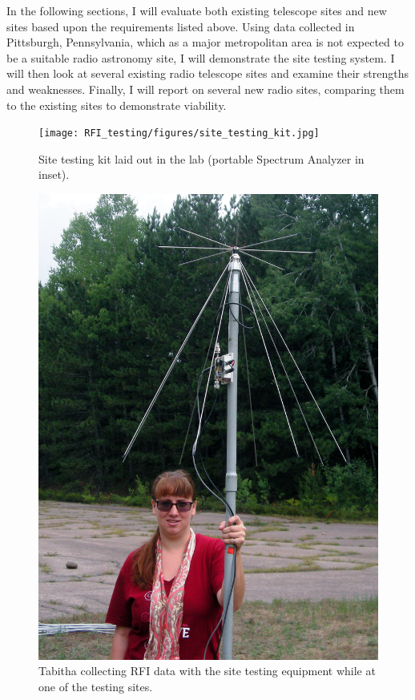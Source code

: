 In the following sections, I will evaluate both existing telescope sites and new sites based upon the requirements listed above. Using data collected in Pittsburgh, Pennsylvania, which as a major metropolitan area is not expected to be a suitable radio astronomy site, I will demonstrate the site testing system. I will then look at several existing radio telescope sites and examine their strengths and weaknesses. Finally, I will report on several new radio sites, comparing them to the existing sites to demonstrate viability. 


\begin{figure}[htb]
\centering
\begin{minipage}[b]{0.47\textwidth}
\centering
\texttt{[image: RFI\_testing/figures/site\_testing\_kit.jpg]}
\caption{Site testing kit laid out in the lab (portable Spectrum Analyzer in inset).}
\label{Fig:site_kit}
\end{minipage}%
\begin{minipage}[b]{0.02\textwidth}
\hspace{1cm}
\end{minipage}%
\begin{minipage}[b]{0.47\textwidth}
\centering
\includegraphics[width=0.95\linewidth]{RFI_testing/figures/voytek_site_test_alg.jpg}
\caption{Tabitha collecting RFI data with the site testing equipment while at one of the testing sites.}
\label{Fig:aroant}
\end{minipage}
\end{figure}

